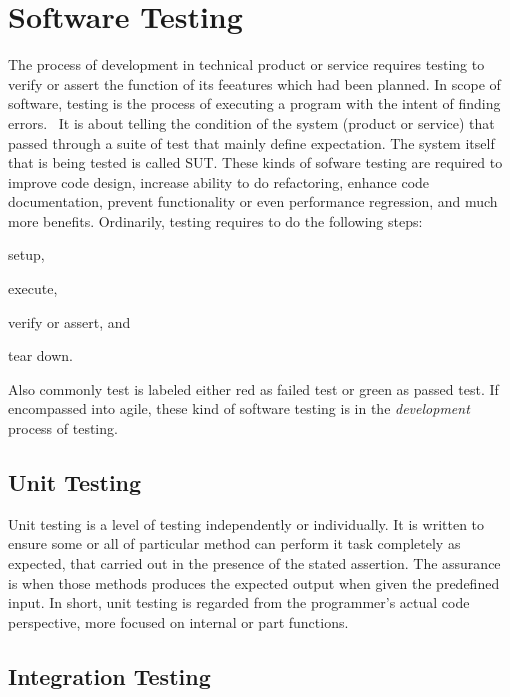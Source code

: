 \section{Software Testing}
\label{sec:software-testing}

The process of development in technical product or service requires testing to verify or assert the function of its feeatures which had been planned.
In scope of software, testing is the process of executing a program with the intent of finding errors.~\autocite{Myers:2012:Testing:6}
It is about telling the condition of the system (product or service) that passed through a suite of test that mainly define expectation.
The system itself that is being tested is called \ac{SUT}.
These kinds of sofware testing are required to improve code design, increase ability to do refactoring, enhance code documentation, prevent functionality or even performance regression, and much more benefits.
Ordinarily, testing requires to do the following steps:
\begin{inparaenum}[\itshape 1\upshape)]
\item setup,
\item execute,
\item verify or assert, and
\item tear down.
\end{inparaenum}
Also commonly test is labeled either red as failed test or green as passed test.
If encompassed into agile, these kind of software testing is in the \textit{development} process of testing.

\subsection{Unit Testing}

Unit testing is a level of testing independently or individually.
It is written to ensure some or all of particular method can perform it task completely as expected, that carried out in the presence of the stated assertion.
The assurance is when those methods produces the expected output when given the predefined input.
In short, unit testing is regarded from the programmer's actual code perspective, more focused on internal or part functions.

\subsection{Integration Testing}


